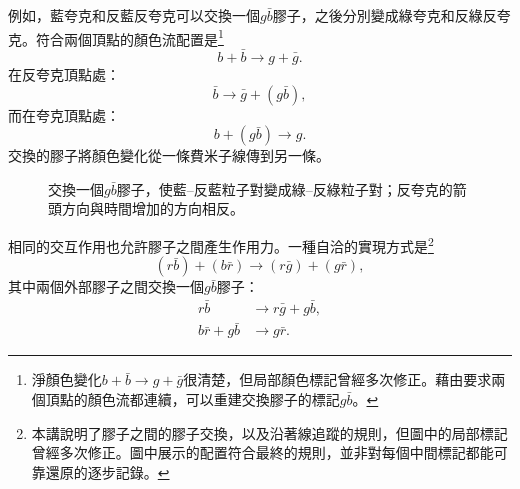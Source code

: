 例如，藍夸克和反藍反夸克可以交換一個\(g\bar b\)膠子，之後分別變成綠夸克和反綠反夸克。符合兩個頂點的顏色流配置是\footnote{淨顏色變化\(b+\bar b\longrightarrow g+\bar g\)很清楚，但局部顏色標記曾經多次修正。藉由要求兩個頂點的顏色流都連續，可以重建交換膠子的標記\(g\bar b\)。}
\begin{equation}
b+\bar b
\longrightarrow
g+\bar g.
\end{equation}
在反夸克頂點處：
\begin{equation}
\bar b\longrightarrow\bar g+(g\bar b),
\end{equation}
而在夸克頂點處：
\begin{equation}
b+(g\bar b)\longrightarrow g.
\end{equation}
交換的膠子將顏色變化從一條費米子線傳到另一條。

\begin{figure}[h]
\centering
{}
\caption{交換一個\(g\bar b\)膠子，使藍--反藍粒子對變成綠--反綠粒子對；反夸克的箭頭方向與時間增加的方向相反。}
\end{figure}

相同的交互作用也允許膠子之間產生作用力。一種自洽的實現方式是\footnote{本講說明了膠子之間的膠子交換，以及沿著線追蹤的規則，但圖中的局部標記曾經多次修正。圖中展示的配置符合最終的規則，並非對每個中間標記都能可靠還原的逐步記錄。}
\begin{equation}
(r\bar b)+(b\bar r)
\longrightarrow
(r\bar g)+(g\bar r),
\end{equation}
其中兩個外部膠子之間交換一個\(g\bar b\)膠子：
\begin{align}
r\bar b&\longrightarrow r\bar g+g\bar b,\\
b\bar r+g\bar b&\longrightarrow g\bar r.
\end{align}


